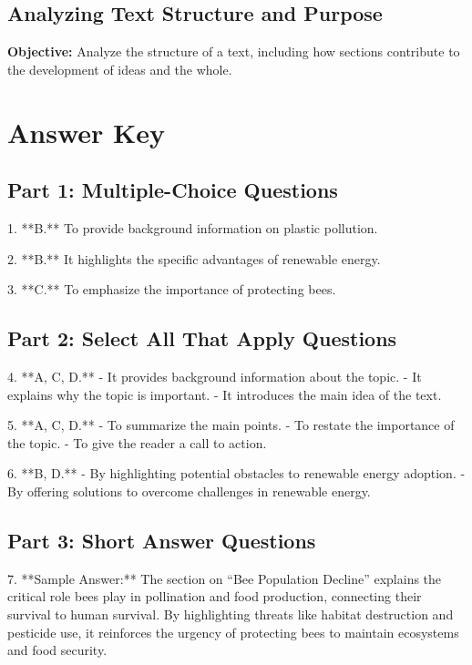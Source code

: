 \documentclass[12pt]{article}
\begin{document}
\subsection*{Analyzing Text Structure and Purpose}
\onehalfspacing

\begin{tcolorbox}[colframe=black!40, colback=gray!0, title=Learning Objective]
\textbf{Objective:} Analyze the structure of a text, including how sections contribute to the development of ideas and the whole.
\end{tcolorbox}

\section*{Answer Key}

\subsection*{Part 1: Multiple-Choice Questions}

1. **B.** To provide background information on plastic pollution.  

2. **B.** It highlights the specific advantages of renewable energy.  

3. **C.** To emphasize the importance of protecting bees.  

\subsection*{Part 2: Select All That Apply Questions}

4. **A, C, D.**  
   - It provides background information about the topic.  
   - It explains why the topic is important.  
   - It introduces the main idea of the text.  

5. **A, C, D.**  
   - To summarize the main points.  
   - To restate the importance of the topic.  
   - To give the reader a call to action.  

6. **B, D.**  
   - By highlighting potential obstacles to renewable energy adoption.  
   - By offering solutions to overcome challenges in renewable energy.  

\subsection*{Part 3: Short Answer Questions}

7. **Sample Answer:** The section on “Bee Population Decline” explains the critical role bees play in pollination and food production, connecting their survival to human survival. By highlighting threats like habitat destruction and pesticide use, it reinforces the urgency of protecting bees to maintain ecosystems and food security.
\end{document}
